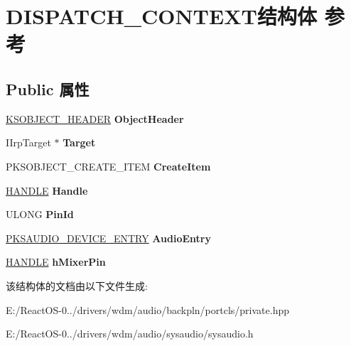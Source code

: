 \hypertarget{struct_d_i_s_p_a_t_c_h___c_o_n_t_e_x_t}{}\section{D\+I\+S\+P\+A\+T\+C\+H\+\_\+\+C\+O\+N\+T\+E\+X\+T结构体 参考}
\label{struct_d_i_s_p_a_t_c_h___c_o_n_t_e_x_t}
\subsection*{Public 属性}
\begin{DoxyCompactItemize}
\item 
\mbox{\label{struct_d_i_s_p_a_t_c_h___c_o_n_t_e_x_t_a63781e2e1b8dcb33872dc23c98c21f14}} 
\hyperlink{interfacevoid}{K\+S\+O\+B\+J\+E\+C\+T\+\_\+\+H\+E\+A\+D\+ER} {\bfseries Object\+Header}
\item 
\mbox{\label{struct_d_i_s_p_a_t_c_h___c_o_n_t_e_x_t_ad26a8243343543d899e8c02ed16f4fd9}} 
I\+Irp\+Target $\ast$ {\bfseries Target}
\item 
\mbox{\label{struct_d_i_s_p_a_t_c_h___c_o_n_t_e_x_t_a3a9af7463e7a14e4b373dc1742a02040}} 
P\+K\+S\+O\+B\+J\+E\+C\+T\+\_\+\+C\+R\+E\+A\+T\+E\+\_\+\+I\+T\+EM {\bfseries Create\+Item}
\item 
\mbox{\label{struct_d_i_s_p_a_t_c_h___c_o_n_t_e_x_t_a62ba92161c8a395c2f556170803208a0}} 
\hyperlink{interfacevoid}{H\+A\+N\+D\+LE} {\bfseries Handle}
\item 
\mbox{\label{struct_d_i_s_p_a_t_c_h___c_o_n_t_e_x_t_a39180ddb3de0235354b192e89951d95d}} 
U\+L\+O\+NG {\bfseries Pin\+Id}
\item 
\mbox{\label{struct_d_i_s_p_a_t_c_h___c_o_n_t_e_x_t_ae981bfad30c9c3b96d7e96b84bd6d2a1}} 
\hyperlink{struct_k_s_a_u_d_i_o___d_e_v_i_c_e___e_n_t_r_y}{P\+K\+S\+A\+U\+D\+I\+O\+\_\+\+D\+E\+V\+I\+C\+E\+\_\+\+E\+N\+T\+RY} {\bfseries Audio\+Entry}
\item 
\mbox{\label{struct_d_i_s_p_a_t_c_h___c_o_n_t_e_x_t_a1d2bb085e8bca29cbb37ba32fa00b8a8}} 
\hyperlink{interfacevoid}{H\+A\+N\+D\+LE} {\bfseries h\+Mixer\+Pin}
\end{DoxyCompactItemize}


该结构体的文档由以下文件生成\+:\begin{DoxyCompactItemize}
\item 
E\+:/\+React\+O\+S-\/0../drivers/wdm/audio/backpln/portcls/private.\+hpp\item 
E\+:/\+React\+O\+S-\/0../drivers/wdm/audio/sysaudio/sysaudio.\+h\end{DoxyCompactItemize}
